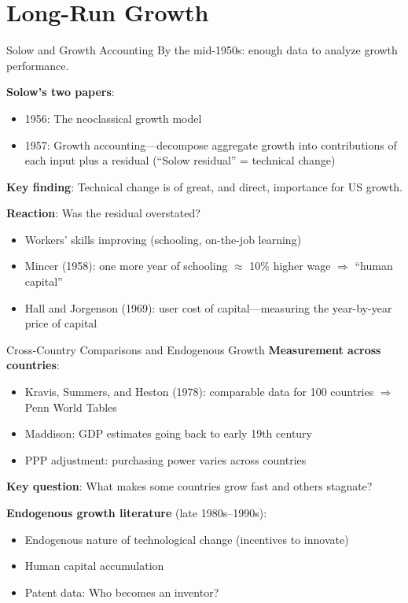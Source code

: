 \documentclass[blue]{beamer}
\begin{document}
\section{Long-Run Growth}

\begin{frame}{Solow and Growth Accounting}
	By the mid-1950s: enough data to analyze growth performance.
	

	\textbf{Solow's two papers}:
		\vspace{-6pt}
	\begin{itemize}
		\item 1956: The neoclassical growth model
		\item 1957: Growth accounting---decompose aggregate growth into contributions of each input plus a residual (``Solow residual'' = technical change)
	\end{itemize}
	

	\textbf{Key finding}: Technical change is of great, and direct, importance for US growth.
	

	\textbf{Reaction}: Was the residual overstated?
		\vspace{-6pt}
	\begin{itemize}
		\item Workers' skills improving (schooling, on-the-job learning)
		\item Mincer (1958): one more year of schooling $\approx$ 10\% higher wage $\Rightarrow$ ``human capital''
		\item Hall and Jorgenson (1969): user cost of capital---measuring the year-by-year price of capital
	\end{itemize}
\end{frame}

\begin{frame}{Cross-Country Comparisons and Endogenous Growth}
	\textbf{Measurement across countries}:
	\begin{itemize}
		\item Kravis, Summers, and Heston (1978): comparable data for 100 countries $\Rightarrow$ Penn World Tables
		\item Maddison: GDP estimates going back to early 19th century
		\item PPP adjustment: purchasing power varies across countries
	\end{itemize}
	
	\bigskip
	\textbf{Key question}: What makes some countries grow fast and others stagnate?
	
	\bigskip
	\textbf{Endogenous growth literature} (late 1980s--1990s):
	\begin{itemize}
		\item Endogenous nature of technological change (incentives to innovate)
		\item Human capital accumulation
		\item Patent data: Who becomes an inventor?
	\end{itemize}
\end{frame}
\end{document}
